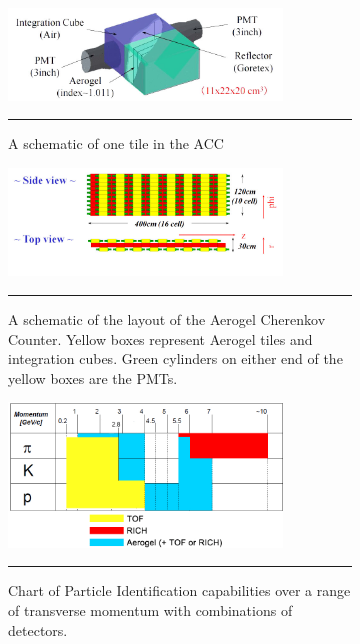 \begin{figure}
\begin{subfigure}[p]{1\textwidth}
   \centering
    \includegraphics[width=0.8\textwidth]{Figures/aerogelchannel.JPG}
  \caption[A schematic of one tile in the ACC]{A schematic of one tile in the ACC}
  \label{fig:accchannel}
    \rule{35em}{0.5pt}\end{subfigure}
\begin{subfigure}[p]{1\textwidth}
  \centering
    \includegraphics[width=0.8\textwidth]{Figures/ACCschematic.jpg}

  \caption[A schematic of the Aerogel Cherenkov Counter]{A schematic of the layout of the Aerogel Cherenkov Counter. Yellow boxes represent Aerogel tiles and integration cubes. Green cylinders on either end of the yellow boxes are the PMTs.}
    \rule{35em}{0.5pt}
  \label{fig:ACCschematic}
\end{subfigure}
\begin{subfigure}[p]{1\textwidth}
  \centering
    \includegraphics[width=0.8\textwidth]{Figures/accrange.jpg}
  \caption[Chart of Particle Identification capabilities over a range of transverse momentum.]{Chart of Particle Identification capabilities over a range of transverse momentum with combinations of detectors.}
    \rule{35em}{0.5pt}
  \label{fig:PIDrange}
\end{subfigure}
\caption{}
\end{figure}


